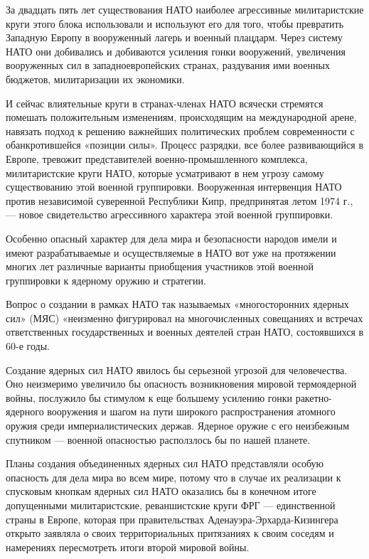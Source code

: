 \documentclass[12pt, a4paper, openany]{book}
\begin{document}
За двадцать пять лет существования НАТО наиболее агрессивные милитаристские круги этого блока использовали и используют его для того, чтобы превратить Западную Европу в вооруженный лагерь и военный плацдарм. Через систему НАТО они добивались и добиваются усиления гонки вооружений, увеличения вооруженных сил в западноевропейских странах, раздувания ими военных бюджетов, милитаризации их экономики.

И сейчас влиятельные круги в странах-членах НАТО всячески стремятся помешать положительным изменениям, происходящим на международной арене, навязать подход к решению важнейших политических проблем современности с обанкротившейся «позиции силы». Процесс разрядки, все более развивающийся в Европе, тревожит представителей военно-промышленного комплекса, милитаристские круги НАТО, которые усматривают в нем угрозу самому существованию этой военной группировки. Вооруженная интервенция НАТО против независимой суверенной Республики Кипр, предпринятая летом 1974 г., — новое свидетельство агрессивного характера этой военной группировки.

Особенно опасный характер для дела мира и безопасности народов имели и имеют разрабатываемые и осуществляемые в НАТО вот уже на протяжении многих лет различные варианты приобщения участников этой военной группировки к ядерному оружию и стратегии.

Вопрос о создании в рамках НАТО так называемых «многосторонних ядерных сил» (МЯС) «неизменно фигурировал на многочисленных совещаниях и встречах ответственных государственных и военных деятелей стран НАТО, состоявшихся в 60-е годы.

Создание ядерных сил НАТО явилось бы серьезной угрозой для человечества. Оно неизмеримо увеличило бы опасность возникновения мировой термоядерной войны, послужило бы стимулом к еще большему усилению гонки ракетно-ядерного вооружения и шагом на пути широкого распространения атомного оружия среди империалистических держав. Ядерное оружие с его неизбежным спутником — военной опасностью расползлось бы по нашей планете.

Планы создания объединенных ядерных сил НАТО представляли особую опасность для дела мира во всем мире, потому что в случае их реализации к спусковым кнопкам ядерных сил НАТО оказались бы в конечном итоге допущенными милитаристские, реваншистские круги ФРГ — единственной страны в Европе, которая при правительствах Аденауэра-Эрхарда-Кизингера открыто заявляла о своих территориальных притязаниях к своим соседям и намерениях пересмотреть итоги второй мировой войны.
\end{document}
